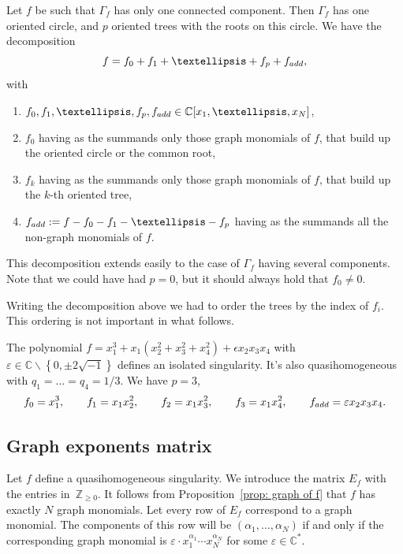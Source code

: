 \documentclass[10pt,a4paper]{article}
\numberwithin{equation}{section}
\newcommand{\CC}{{\mathbb{C}}}
\newcommand{\ZZ}{{\mathbb{Z}}}
\newcommand{\eps}{\varepsilon}
\begin{document}
Let $f$ be such that $\Gamma_f$ has only one connected component. Then $\Gamma_f$ has one oriented circle, and $p$ oriented trees with the roots on this circle.
We have the decomposition
\begin{equation}\label{eq: f decomposition}
	f = f_0 + f_1 + \dots + f_p + f_{\rm add},
\end{equation}
with
\begin{enumerate}\itemsep=0pt
 \item[(1)] $f_0,f_1,\dots,f_p, f_{\rm add} \in \CC[x_1,\dots,x_N]$,
 \item[(2)] $f_0$ having as the summands only those graph monomials of $f$, that build up the oriented circle or the common root,
 \item[(3)] $f_k$ having as the summands only those graph monomials of $f$, that build up the $k$-th oriented tree,
 \item[(4)] $f_{\rm add} := f - f_0 - f_1 -\dots - f_p$ having as the summands all the non-graph monomials of $f$.
\end{enumerate}
This decomposition extends easily to the case of $\Gamma_f$ having several components. Note that we could have had $p=0$, but it should always hold that $f_0 \neq 0$.

Writing the decomposition above we had to order the trees by the index of $f_i$. This ordering is not important in what follows.

\begin{Example}
	The polynomial $f = x_1^3 + x_1 \left(x_2^2+x_3^2+x_4^2\right) + \epsilon x_2 x_3 x_4 $ with $\eps \in \CC \backslash \left\lbrace 0, \pm 2 \sqrt{-1}\right\rbrace$ defines an isolated singularity. It's also quasihomogeneous with $q_1=\dots=q_4=1/3$.
	We have $p = 3$,
	\[
		f_0 = x_1^3, \qquad f_1 = x_1 x_2^2, \qquad f_2 = x_1 x_3^2, \qquad f_3 = x_1 x_4^2, \qquad f_{\rm add} = \eps x_2x_3x_4.
	\]
\end{Example}

\subsection{Graph exponents matrix}
Let $f$ define a quasihomogeneous singularity. We introduce the matrix $E_f$ with the entries in~$\ZZ_{\ge 0}$. It follows from Proposition~\ref{prop: graph of f} that $f$ has exactly $N$ graph monomials. Let every row of $E_f$ correspond to a graph monomial. The components of this row will be $(\alpha_1,\dots,\alpha_N)$ if and only if the corresponding graph monomial is $\eps \cdot x_1^{\alpha_1} \cdots x_N^{\alpha_N}$ for some $\eps \in \CC^\ast$.
\end{document}
